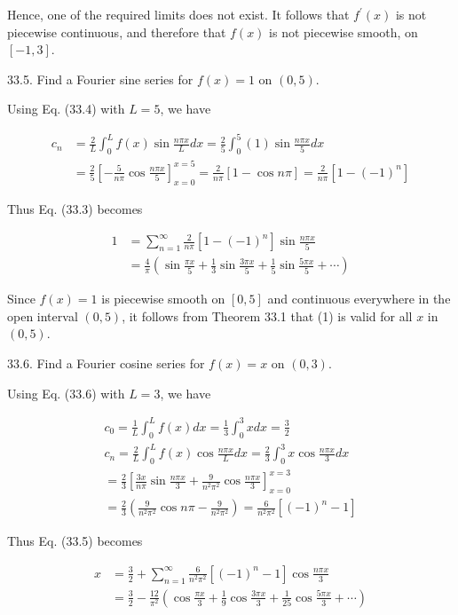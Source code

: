 \documentclass[10pt]{article}
\begin{document}
Hence, one of the required limits does not exist. It follows that $f^{\prime}(x)$ is not piecewise continuous, and therefore that $f(x)$ is not piecewise smooth, on $[-1,3]$.

33.5. Find a Fourier sine series for $f(x)=1$ on $(0,5)$.

Using Eq. (33.4) with $L=5$, we have

$$
\begin{aligned}
c_{n} & =\frac{2}{L} \int_{0}^{L} f(x) \sin \frac{n \pi x}{L} d x=\frac{2}{5} \int_{0}^{5}(1) \sin \frac{n \pi x}{5} d x \\
& =\frac{2}{5}\left[-\frac{5}{n \pi} \cos \frac{n \pi x}{5}\right]_{x=0}^{x=5}=\frac{2}{n \pi}[1-\cos n \pi]=\frac{2}{n \pi}\left[1-(-1)^{n}\right]
\end{aligned}
$$

Thus Eq. (33.3) becomes


\begin{align*}
1 & =\sum_{n=1}^{\infty} \frac{2}{n \pi}\left[1-(-1)^{n}\right] \sin \frac{n \pi x}{5} \\
& =\frac{4}{\pi}\left(\sin \frac{\pi x}{5}+\frac{1}{3} \sin \frac{3 \pi x}{5}+\frac{1}{5} \sin \frac{5 \pi x}{5}+\cdots\right) \tag{1}
\end{align*}


Since $f(x)=1$ is piecewise smooth on $[0,5]$ and continuous everywhere in the open interval $(0,5)$, it follows from Theorem 33.1 that (1) is valid for all $x$ in $(0,5)$.

33.6. Find a Fourier cosine series for $f(x)=x$ on $(0,3)$.

Using Eq. (33.6) with $L=3$, we have

$$
\begin{gathered}
c_{0}=\frac{1}{L} \int_{0}^{L} f(x) d x=\frac{1}{3} \int_{0}^{3} x d x=\frac{3}{2} \\
c_{n}=\frac{2}{L} \int_{0}^{L} f(x) \cos \frac{n \pi x}{L} d x=\frac{2}{3} \int_{0}^{3} x \cos \frac{n \pi x}{3} d x \\
=\frac{2}{3}\left[\frac{3 x}{n \pi} \sin \frac{n \pi x}{3}+\frac{9}{n^{2} \pi^{2}} \cos \frac{n \pi x}{3}\right]_{x=0}^{x=3} \\
=\frac{2}{3}\left(\frac{9}{n^{2} \pi^{2}} \cos n \pi-\frac{9}{n^{2} \pi^{2}}\right)=\frac{6}{n^{2} \pi^{2}}\left[(-1)^{n}-1\right]
\end{gathered}
$$

Thus Eq. (33.5) becomes


\begin{align*}
x & =\frac{3}{2}+\sum_{n=1}^{\infty} \frac{6}{n^{2} \pi^{2}}\left[(-1)^{n}-1\right] \cos \frac{n \pi x}{3} \\
& =\frac{3}{2}-\frac{12}{\pi^{2}}\left(\cos \frac{\pi x}{3}+\frac{1}{9} \cos \frac{3 \pi x}{3}+\frac{1}{25} \cos \frac{5 \pi x}{3}+\cdots\right) \tag{1}
\end{align*}
\end{document}
